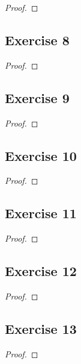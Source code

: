 \documentclass[14pt]{extarticle}
\begin{document}
\begin{proof}

\end{proof}

\subsection{Exercise 8}

\begin{proof}

\end{proof}

\subsection{Exercise 9}

\begin{proof}

\end{proof}

\subsection{Exercise 10}

\begin{proof}

\end{proof}

\subsection{Exercise 11}

\begin{proof}

\end{proof}

\subsection{Exercise 12}

\begin{proof}

\end{proof}

\subsection{Exercise 13}

\begin{proof}

\end{proof}
\end{document}
